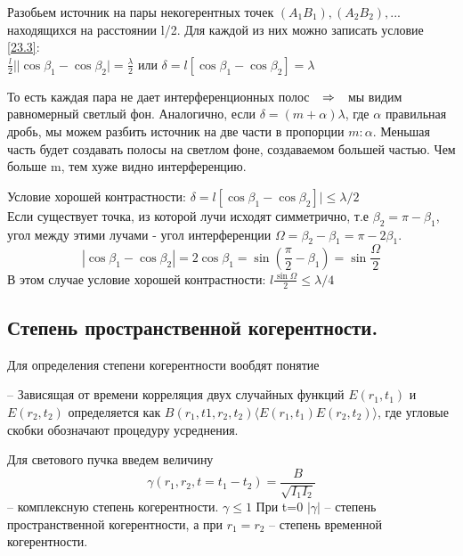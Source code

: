 \begin{theor}\label{Протяженный источник длины l.}
Разобьем источник на пары некогерентных точек $(A_1 B_1), (A_2 B_2), ... $ находящихся на расстоянии l/2. Для каждой из них можно записать условие \ref{23.3}: 
\\$\frac{l}{2}||\cos{\beta_1}-\cos{\beta_2}|=\frac{\lambda}{2}$ или $\delta= l[\cos{\beta_1}-\cos{\beta_2}]=\lambda$ 

То есть каждая пара не дает интерференционных полос$\quad \Rightarrow \quad$мы видим равномерный светлый фон.
Аналогично, если $\delta=(m+\alpha)\lambda$, где $\alpha$ правильная дробь, мы можем разбить источник на две части в пропорции $m:\alpha$. Меньшая часть будет создавать полосы на светлом фоне, создаваемом большей частью. Чем больше m, тем хуже видно интерференцию.

Условие хорошей контрастности:
$\delta= l[\cos{\beta_1}-\cos{\beta_2}]|\leq \lambda/2$
\\Если существует точка, из которой лучи исходят симметрично, т.е $\beta_2=\pi-\beta_1$, угол между этими лучами - угол интерференции $\Omega = \beta_2-\beta_1=\pi - 2\beta_1$.
$$|\cos{\beta_1}-\cos{\beta_2}|=2\cos{\beta_1}=\sin({\frac{\pi}{2}-\beta_1})=\sin{\frac{\Omega}{2}}$$ %
В этом случае условие хорошей контрастности: 
$ l\frac{\sin{\Omega}}{2}\leq \lambda/4$ 
\end{theor}
\subsection{Степень пространственной когерентности.}
Для определения степени когерентности вообдят понятие 

 -- Зависящая от времени корреляция двух случайных функций $E(r_1, t_1)$ и $E(r_2, t_2)$ определяется как $B(r_1, t1, r_2, t_2)\langle E(r_1, t_1) E(r_2, t_2)\rangle$, где угловые скобки обозначают процедуру усреднения.  

Для светового пучка введем величину $$\gamma(r_1,r_2, t=t_1-t_2)=\frac{B}{\sqrt{I_1I_2}}$$ -- комплексную степень когерентности. $\gamma\leq1$ 
При t=0 $|\gamma|$ -- степень пространственной когерентности, а при $r_1=r_2$ -- степень временной когерентности.

